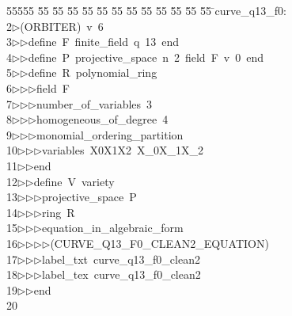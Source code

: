 %
%
\begin{tabbing}
55555 \= 55 \= 55 \= 55 \= 55 \= 55 \= 55 \= 55 \= 55 \= 55 \= 55 \= 55 \= 55 \= \>curve\_q13\_f0:\\[0pt]
2\>$\triangleright$\>(ORBITER)\ v\ 6\ \\[0pt]
3\>$\triangleright$\>$\triangleright$\>define\ F\ finite\_field\ q\ 13\ end\ \\[0pt]
4\>$\triangleright$\>$\triangleright$\>define\ P\ projective\_space\ n\ 2\ field\ F\ v\ 0\ end\ \\[0pt]
5\>$\triangleright$\>$\triangleright$\>define\ R\ polynomial\_ring\ \\[0pt]
6\>$\triangleright$\>$\triangleright$\>$\triangleright$\>field\ F\ \\[0pt]
7\>$\triangleright$\>$\triangleright$\>$\triangleright$\>number\_of\_variables\ 3\ \\[0pt]
8\>$\triangleright$\>$\triangleright$\>$\triangleright$\>homogeneous\_of\_degree\ 4\ \\[0pt]
9\>$\triangleright$\>$\triangleright$\>$\triangleright$\>monomial\_ordering\_partition\ \\[0pt]
10\>$\triangleright$\>$\triangleright$\>$\triangleright$\>variables\ X0X1X2\ X\_0X\_1X\_2\ \\[0pt]
11\>$\triangleright$\>$\triangleright$\>end\ \\[0pt]
12\>$\triangleright$\>$\triangleright$\>define\ V\ variety\ \\[0pt]
13\>$\triangleright$\>$\triangleright$\>$\triangleright$\>projective\_space\ P\ \\[0pt]
14\>$\triangleright$\>$\triangleright$\>$\triangleright$\>ring\ R\ \\[0pt]
15\>$\triangleright$\>$\triangleright$\>$\triangleright$\>equation\_in\_algebraic\_form\ \\[0pt]
16\>$\triangleright$\>$\triangleright$\>$\triangleright$\>$\triangleright$\>(CURVE\_Q13\_F0\_CLEAN2\_EQUATION)\ \\[0pt]
17\>$\triangleright$\>$\triangleright$\>$\triangleright$\>label\_txt\ curve\_q13\_f0\_clean2\ \\[0pt]
18\>$\triangleright$\>$\triangleright$\>$\triangleright$\>label\_tex\ curve\_q13\_f0\_clean2\ \\[0pt]
19\>$\triangleright$\>$\triangleright$\>end\\[0pt]
20\>\end{tabbing}

